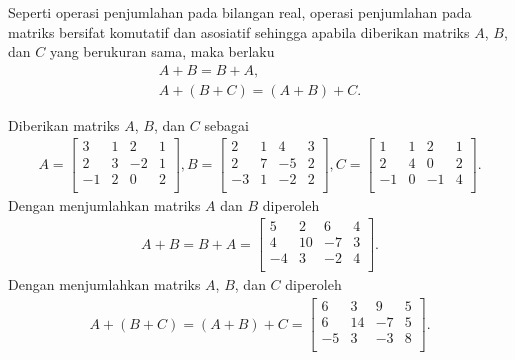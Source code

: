 Seperti operasi penjumlahan pada bilangan real, operasi penjumlahan pada matriks bersifat komutatif dan asosiatif sehingga apabila diberikan matriks $A$, $B$, dan $C$ yang berukuran sama, maka berlaku
\begin{gather*}
    A+B = B+A, \\
    A+(B+C) = (A+B)+C.
\end{gather*}
\begin{contoh}\label{A+B Contoh}
Diberikan matriks $A$, $B$, dan $C$ sebagai
\begin{gather*} 
        A=
        \begin{bmatrix}
        3 & 1 & 2 & 1\\
        2 & 3 & -2 & 1\\
        -1 & 2 & 0 & 2\\
        \end{bmatrix}
        ,B=
        \begin{bmatrix}
        2 & 1 & 4 & 3\\
        2 & 7 & -5 & 2\\
        -3 & 1 & -2 & 2\\
        \end{bmatrix} 
        ,C=
        \begin{bmatrix}
        1 & 1 & 2 & 1\\
        2 & 4 & 0 & 2\\
        -1 & 0 & -1 & 4\\
        \end{bmatrix}.
        \end{gather*}
        Dengan menjumlahkan matriks $A$ dan $B$ diperoleh
        \begin{gather*}
        A+B=B+A=
        \begin{bmatrix}
        5 & 2 & 6 & 4\\
        4 & 10 & -7 & 3\\
        -4 & 3 & -2 & 4\\
        \end{bmatrix}.
        \end{gather*}
        Dengan menjumlahkan matriks $A$, $B$, dan $C$ diperoleh
        \begin{gather*}  
        A+(B+C) = (A+B)+C=
        \begin{bmatrix}
        6 & 3 & 9 & 5\\
        6 & 14 & -7 & 5\\
        -5 & 3 & -3 & 8\\
        \end{bmatrix}. \\
\end{gather*}
\end{contoh}
